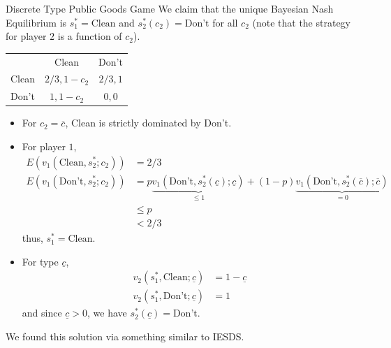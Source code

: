 \documentclass[10pt]{extarticle}
\begin{document}
\begin{problem}{Discrete Type Public Goods Game}
    We claim that the unique Bayesian Nash Equilibrium is $s_1^{\ast} = \text{Clean}$ and $s_{2}^{\ast}(c_2) = \text{Don't}$ for all $c_2$ (note that the strategy for player $2$ is a function of $c_2$).
    \begin{center}
      \renewcommand{\arraystretch}{1.5}
      \begin{tabular}{c|c|c|}
        \multicolumn{1}{c}{} & \multicolumn{1}{c}{Clean} & \multicolumn{1}{c}{Don't}\\
        \cline{2-3}
        Clean & $2/3,1-c_2$ & $2/3,1$\\
        \cline{2-3}
        Don't & $1,1-c_2$ & $0,0$\\
        \cline{2-3}
      \end{tabular}
    \end{center}
    \begin{itemize}
      \item For $c_2 = \overline{c}$, Clean is strictly dominated by Don't.
      \item For player $1$,
        \begin{align*}
          E\left(v_1(\text{Clean},s_2^{\ast};c_2)\right) &= 2/3\\
          E\left(v_1(\text{Don't},s_{2}^{\ast};c_2)\right) &= p\underbrace{v_1(\text{Don't},s_2^{\ast}( \underline{c} );\underline{c})}_{\leq 1} + (1-p)\underbrace{v_1(\text{Don't},s_2^{\ast}( \overline{c} ); \overline{c})}_{=0}\\
                                              &\leq p\\
                                              &< 2/3
        \end{align*}
        thus, $s_1^{\ast} = \text{Clean}$.
      \item For type $ \underline{c} $,
        \begin{align*}
          v_2(s_1^{\ast},\text{Clean}; \underline{c}) &= 1- \underline{c}\\
          v_2(s_1^{\ast},\text{Don't}; \underline{c}) &= 1
        \end{align*}
        and since $ \underline{c} > 0 $, we have $s_2^{\ast}( \underline{c} ) = \text{Don't}$.
    \end{itemize}
    We found this solution via something similar to IESDS.
  \end{problem}
\end{document}
